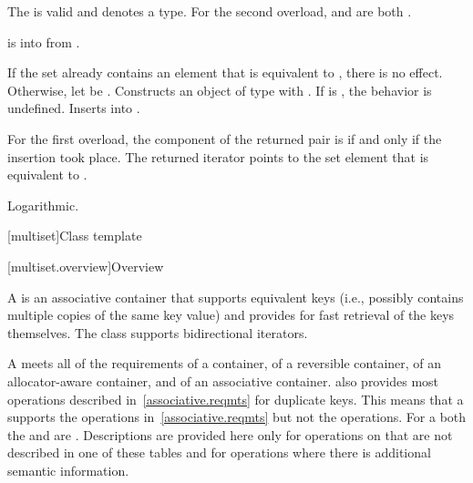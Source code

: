 \begin{itemdescr}
\pnum
\constraints
The  
is valid and denotes a type.
For the second overload,
 and
 are both .

\pnum
\expects
{} is  into  from
.

\pnum
\effects
If the set already contains an element that is equivalent to ,
there is no effect.
Otherwise, let  be .
Constructs an object  of type 
with .
If  is , the behavior is undefined.
Inserts  into .

\pnum
\returns
For the first overload,
the  component of the returned pair is 
if and only if the insertion took place.
The returned iterator points to the set element that is equivalent to .

\pnum
\complexity
Logarithmic.
\end{itemdescr}

[multiset]{Class template }

[multiset.overview]{Overview}

\pnum
{}%
A
is an associative container that supports equivalent keys (i.e., possibly contains multiple copies of
the same key value) and provides for fast retrieval of the keys themselves.
The
 class
supports bidirectional iterators.

\pnum
A  meets all of the requirements
of a container,
of a reversible container,
of an allocator-aware container, and
of an associative container.
also provides most operations described in~\ref{associative.reqmts}
for duplicate keys.
This means that a
supports the
operations in~\ref{associative.reqmts}
but not the
operations.
For a
both the
and
are
.
Descriptions are provided here only for operations on
that are not described in one of these tables
and for operations where there is additional semantic information.

